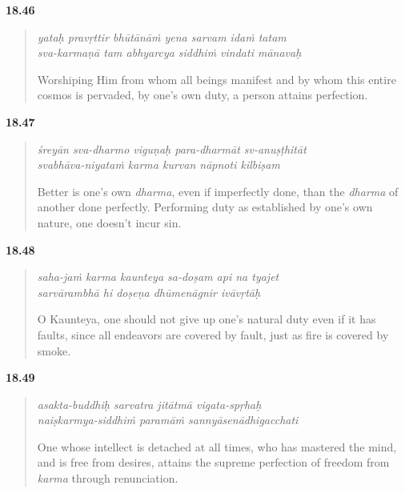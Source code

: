 \par\noindent\textbf{18.46}\par
\begin{verse}
\textit{yataḥ pravṛttir bhūtānāṁ yena sarvam idaṁ tatam} \\
\textit{sva-karmaṇā tam abhyarcya siddhiṁ vindati mānavaḥ}

\noindent Worshiping Him from whom all beings manifest and by whom this entire cosmos is pervaded, by one’s own duty, a person attains perfection.
\end{verse}
\par



\par\noindent\textbf{18.47}\par
\begin{verse}
\textit{śreyān sva-dharmo viguṇaḥ para-dharmāt sv-anuṣṭhitāt} \\
\textit{svabhāva-niyataṁ karma kurvan nāpnoti kilbiṣam}

\noindent Better is one’s own \textit{dharma}, even if imperfectly done, than the \textit{dharma} of another done perfectly. Performing duty as established by one’s own nature, one doesn't incur sin.
\end{verse}
\par



\par\noindent\textbf{18.48}\par
\begin{verse}
\textit{saha-jaṁ karma kaunteya sa-doṣam api na tyajet} \\
\textit{sarvārambhā hi doṣeṇa dhūmenāgnir ivāvṛtāḥ}

\noindent O Kaunteya, one should not give up one's natural duty even if it has faults, since all endeavors are covered by fault, just as fire is covered by smoke.
\end{verse}
\par



\par\noindent\textbf{18.49}\par
\begin{verse}
\textit{asakta-buddhiḥ sarvatra jitātmā vigata-spṛhaḥ} \\
\textit{naiṣkarmya-siddhiṁ paramāṁ sannyāsenādhigacchati}

\noindent One whose intellect is detached at all times, who has mastered the mind, and is free from desires, attains the supreme perfection of freedom from \textit{karma} through renunciation.
\end{verse}
\par



